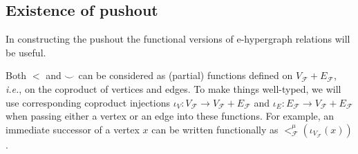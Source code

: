 \subsection{Existence of pushout}

In constructing the pushout the functional versions of e-hypergraph relations will be useful.
\begin{remark}
    Both $<$ and ${\smile}$ can be considered as (partial) functions defined on $V_{\mathcal{F}} + E_{\mathcal{F}}$, \textit{i.e.}, on the coproduct of vertices and edges.
    To make things well-typed, we will use corresponding coproduct injections $\iota_{V} : {V_{\mathcal{F}}} \to V_{\mathcal{F}} + E_{\mathcal{F}}$ and $\iota_{E} : {E_{\mathcal{F}}} \to V_{\mathcal{F}} + E_{\mathcal{F}}$ when passing either a vertex or an edge into these functions.
    For example, an immediate successor of a vertex $x$ can be written functionally as $<_{\mathcal{F}}^{\mu}(\iota_{V_{\mathcal{F}}}(x))$.
\end{remark}

